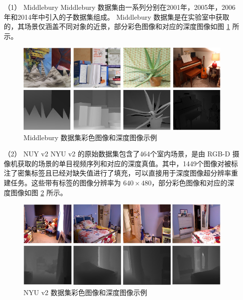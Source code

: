\begin{itemize}
	\item[（1）] Middlebury \newline	
	Middlebury 数据集由一系列分别在2001年，2005年，2006年和2014年中引入的子数据集组成。 Middlebury 数据集是在实验室中获取的，其场景仅涵盖不同对象的近景，部分彩色图像和对应的深度图像如图 \ref{fig:fig4-1} 所示。
	
	\begin{figure}[!htbp]
	\centering
	\includegraphics{figures/27.png}
	\caption{Middlebury 数据集彩色图像和深度图像示例}
	\label{fig:fig4-1}
\end{figure}

\newpage
\item[（2）] NUY v2 \newline
NYU v2 的原始数据集包含了464个室内场景，是由 RGB-D 摄像机获取的场景的单目视频序列和对应的深度真值。其中，1449个图像对被标注了密集标签且已经对缺失值进行了填充，可以直接用于深度图像超分辨率重建任务。这些带有标签的图像分辨率为 $640 \times 480$，部分彩色图像和对应的深度图像如图 \ref{fig:fig4-2} 所示。

	\begin{figure}[!htbp]
	\centering
	\includegraphics{figures/28.png}
	\caption{NYU v2 数据集彩色图像和深度图像示例}
	\label{fig:fig4-2}
	\end{figure}
	
\end{itemize}


